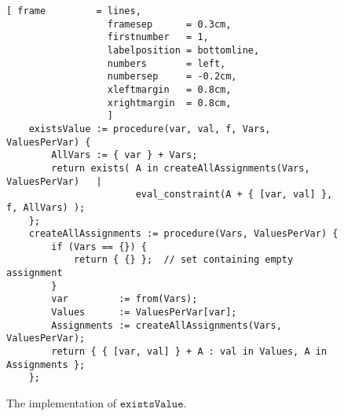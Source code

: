 \begin{figure}[!ht]
\centering
\begin{Verbatim}[ frame         = lines, 
                  framesep      = 0.3cm, 
                  firstnumber   = 1,
                  labelposition = bottomline,
                  numbers       = left,
                  numbersep     = -0.2cm,
                  xleftmargin   = 0.8cm,
                  xrightmargin  = 0.8cm,
                  ]
    existsValue := procedure(var, val, f, Vars, ValuesPerVar) {
        AllVars := { var } + Vars;
        return exists( A in createAllAssignments(Vars, ValuesPerVar)   |
                       eval_constraint(A + { [var, val] }, f, AllVars) );
    };
    createAllAssignments := procedure(Vars, ValuesPerVar) {
        if (Vars == {}) {
            return { {} };  // set containing empty assignment
        }
        var         := from(Vars);
        Values      := ValuesPerVar[var];
        Assignments := createAllAssignments(Vars, ValuesPerVar);
        return { { [var, val] } + A : val in Values, A in Assignments };
    };
\end{Verbatim}
\vspace*{-0.3cm}
\caption{The implementation of $\texttt{existsValue}$.}
\label{fig:csp-consistency.stlx:existsValue}
\end{figure}


